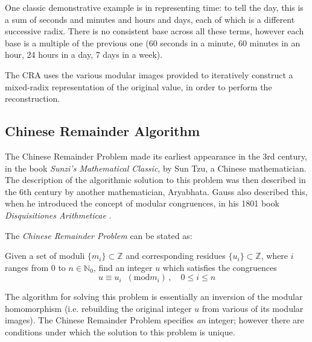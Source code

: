 \documentclass[letterpaper,12pt,titlepage,oneside,final]{book}
\begin{document}
One classic demonstrative example is in representing time: to tell the day, this is a sum of seconds and minutes and hours and days, each of which is a different successive radix.  There is no consistent base across all these terms, however each base is a multiple of the previous one (60 seconds in a minute, 60 minutes in an hour, 24 hours in a day, 7 days in a week).     

The CRA uses the various modular images provided to iteratively construct a mixed-radix representation of the original value, in order to perform the reconstruction.


\subsection{Chinese Remainder Algorithm} 

The Chinese Remainder Problem made its earliest appearance in the 3rd century, in the book \textit{Sunzi's Mathematical Classic}, by Sun Tzu, a Chinese mathematician.  The description of the algorithmic solution to this problem was then described in the 6th century by another mathematician, Aryabhata.  Gauss also described this, when he introduced the concept of modular congruences, in his 1801 book \textit{Disquisitiones Arithmeticae} \cite{Geddes}.  

\noindent The \textit{Chinese Remainder Problem} can be stated as: 
\begin{addmargin}[2em]{2em}%
  Given a set of moduli ${\{m_i\} \subset \mathbb{Z}}$ and corresponding residues ${\{u_i\} \subset \mathbb{Z}}$, where ${i}$ ranges from 0 to ${n \in \mathbb{N}_0}$, find an integer ${u}$ which satisfies the congruences
  \begin{equation*}
    u \equiv u_i \;\; (\textrm{mod} m_i)\, ,  \quad 0 \leq i \leq n
  \end{equation*} 
\end{addmargin}

The algorithm for solving this problem is essentially an inversion of the modular homomorphism (i.e. rebuilding the original integer ${u}$ from various of its modular images).  The Chinese Remainder Problem specifies \textit{an} integer; however there are conditions under which the solution to this problem is unique.   
\end{document}
